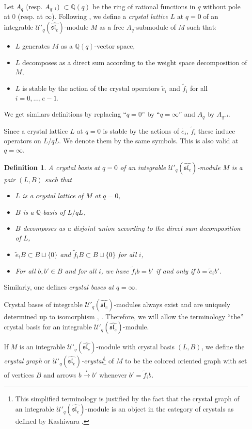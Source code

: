 \documentclass[twoside,12pt]{amsart}
\theoremstyle{plain}
\newcommand{\Q}{\mathbb{Q}}
\newcommand{\te}{\tilde{e}}
\newcommand{\tf}{\tilde{f}}
\newcommand{\lra}{\longrightarrow}
\newcommand{\Ue}{\mathcal{U}'_q (\widehat{\mathfrak{sl}_e})}
\newtheorem{defi}[num]{Definition}
\theoremstyle{remark}
\begin{document}
\medskip

Let $A_q$ (resp. $A_{q^{-1}}$) $\subset \Q(q)$  be the ring of rational functions in $q$ without pole at $0$ (resp. at $\infty$).
Following \cite[Definition 3.1.2]{Kashiwara1993}, 
we define a \textit{crystal lattice} $L$ at $q=0$ of an integrable $\Ue$-module $M$  as a free $A_q$-submodule of $M$ such that:
\begin{itemize}
 \item $L$ generates $M$ as a $\Q(q)$-vector space,
\item $L$ decomposes as a direct sum according to the weight space decomposition of $M$, 
\item $L$ is stable by the action of the crystal operators $\te_i^{}$ and $\tf_i^{}$ for all $i=0,\dots,e-1$.
\end{itemize}
We get similars definitions by replacing ``$q=0$'' by ``$q=\infty$'' and $A_q$ by $A_{q^{-1}}$.

Since a crystal lattice $L$ at $q=0$ is stable by the actions of $\te_i^{}$, $\tf_i^{}$
these induce operators on $L/qL$.
We denote them by the same symbols.
This is also valid at $q=\infty$.


\begin{defi}\label{def_crystal_basis}
A \textit{crystal basis} at $q=0$ of an integrable $\Ue$-module $M$ is a pair $(L,B)$ such that
\begin{itemize}
 \item $L$ is a crystal lattice of $M$ at $q=0$,
 \item $B$ is a $\Q$-basis of $L/qL$,
 \item $B$ decomposes as a disjoint union according to the direct sum decomposition of $L$,
 \item $\te_i B \subset B\sqcup\{0\}$ and $\tf_i B \subset B\sqcup\{0\}$ for all $i$,
 \item For all $b,b'\in B$ and for all $i$, we have $\tf_i b = b'$ if and only if $b=\te_i b'$.
\end{itemize}
\end{defi}

Similarly, one defines \textit{crystal bases at $q=\infty$}.

Crystal bases of integrable $\Ue$-modules always exist 
and are uniquely determined up to isomorphism \cite[Theorems 2 and 3]{Kashiwara1991}, \cite[Theorem 2.2]{JMMO1991}.
Therefore, we will allow the terminology ``the'' crystal basis for an integrable $\Ue$-module.

If $M$ is an integrable $\Ue$-module with crystal basis $(L,B)$, we define
the \textit{crystal graph} or \textit{$\Ue$-crystal}\footnote{
This simplified terminology is justified by the fact that the crystal graph of an integrable $\Ue$-module is an object in the category of crystals 
as defined by Kashiwara \cite[Section 7.2]{Kashiwara1995}.}  
of $M$ to be the colored oriented graph with set of vertices $B$
and arrows $b\overset{i}{\lra}b'$ whenever $b'=\tf_i b$.
\end{document}
